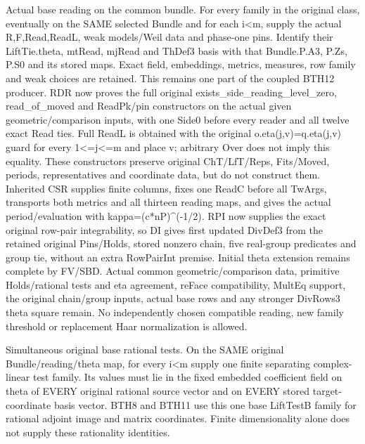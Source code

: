\begin{description}[style=nextline]
\item[31. BASE\_THETA\_READINGS --- C] Actual base reading on the common bundle. For every family in the original class, eventually on the SAME selected Bundle and for each i<m, supply the actual R,F,Read,ReadL, weak models/\allowbreak{}Weil data and phase-one pins. Identify their LiftTie.theta, mtRead, mjRead and ThDef3 basis with that Bundle.P.A3, P.Zs, P.S0 and its stored maps. Exact field, embeddings, metrics, measures, row family and weak choices are retained. This remains one part of the coupled BTH12 producer. RDR now proves the full original exists\_side\_reading\_level\_zero, read\_of\_moved and ReadPk/\allowbreak{}pin constructors on the actual given geometric/\allowbreak{}comparison inputs, with one Side0 before every reader and all twelve exact Read ties. Full ReadL is obtained with the original o.eta(j,v)=q.eta(j,v) guard for every 1<=j<=m and place v; arbitrary Over does not imply this equality. These constructors preserve original ChT/\allowbreak{}LfT/\allowbreak{}Reps, Fits/\allowbreak{}Moved, periods, representatives and coordinate data, but do not construct them. Inherited CSR supplies finite columns, fixes one ReadC before all TwArgs, transports both metrics and all thirteen reading maps, and gives the actual period/\allowbreak{}evaluation with kappa=(c*nP)\textasciicircum{}(-1/\allowbreak{}2). RPI now supplies the exact original row-pair integrability, so DI gives first updated DivDef3 from the retained original Pins/\allowbreak{}Holds, stored nonzero chain, five real-group predicates and group tie, without an extra RowPairInt premise. Initial theta extension remains complete by FV/\allowbreak{}SBD. Actual common geometric/\allowbreak{}comparison data, primitive Holds/\allowbreak{}rational tests and eta agreement, reFace compatibility, MultEq support, the original chain/\allowbreak{}group inputs, actual base rows and any stronger DivRows3 theta square remain. No independently chosen compatible reading, new family threshold or replacement Haar normalization is allowed.

\item[32. BASE\_THETA\_RATIONAL\_TESTS --- C] Simultaneous original base rational tests. On the SAME original Bundle/\allowbreak{}reading/\allowbreak{}theta map, for every i<m supply one finite separating complex-linear test family. Its values must lie in the fixed embedded coefficient field on theta of EVERY original rational source vector and on EVERY stored target-coordinate basis vector. BTH8 and BTH11 use this one base LiftTestB family for rational adjoint image and matrix coordinates. Finite dimensionality alone does not supply these rationality identities.


\end{description}
